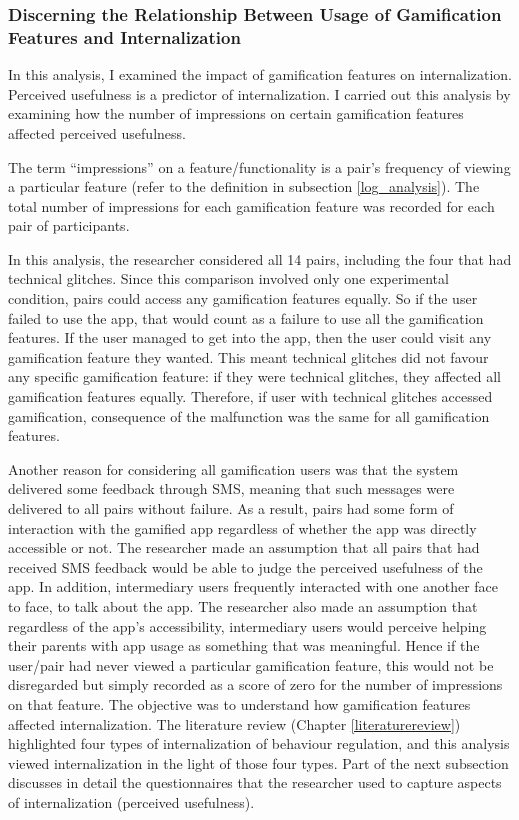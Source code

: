 \subsubsection*{Discerning the Relationship Between Usage of Gamification Features and Internalization}
In this analysis, I examined the impact of gamification features on internalization. Perceived usefulness is a predictor of internalization. I carried out this analysis by examining how the number of impressions on certain gamification features affected perceived usefulness.
 
The term ``impressions'' on a feature/functionality is a pair's frequency of viewing a particular feature (refer to the definition in subsection \ref{log_analysis}). The total number of impressions for each gamification feature was recorded for each pair of participants.

In this analysis, the researcher considered all 14 pairs, including the four that had technical glitches. Since this comparison involved only one experimental condition, pairs could access any gamification features equally. So if the user failed to use the app, that would count as a failure to use all the gamification features. If the user managed to get into the app, then the user could visit any  gamification feature they wanted. This meant technical glitches did not favour any specific gamification feature: if they were technical glitches, they affected all gamification features equally. Therefore, if user with technical glitches accessed  gamification, consequence of the malfunction was the same for all gamification features. 

Another reason for considering all gamification users was that the system delivered some feedback through SMS, meaning that such messages were delivered to all pairs without failure. As a result, pairs had some form of interaction with the gamified app regardless of whether the app was directly accessible or not.  The researcher made an assumption that all pairs that had received SMS feedback would be able to judge the perceived usefulness of the app. In addition, intermediary users frequently interacted with one another face to face, to talk about the app.  The researcher also made an assumption that regardless of the app's accessibility, intermediary users would perceive helping their parents with app usage as something that was meaningful. Hence if the user/pair had never viewed a particular gamification feature, this would not be disregarded but simply recorded as a score of zero for the number of impressions on that feature. The objective was to understand how gamification features affected internalization. The literature review (Chapter \ref{literaturereview}) highlighted four types of internalization of behaviour regulation, and this analysis viewed internalization in the light of those four types. Part of the next subsection discusses in detail the questionnaires that the researcher used to capture aspects of internalization (perceived usefulness).

